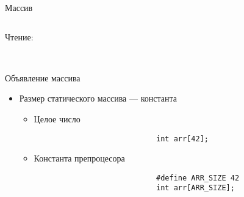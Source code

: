 \documentclass[aspectratio=169,14pt]{beamer}
\begin{document}
\begin{frame}[fragile,t]{Массив}
\begin{onlyenv}
\begin{columns}
\begin{column}{0.5\textwidth}
                    \begin{center}
                        \begin{minipage}{0.9\textwidth}
                            {\color{maincolor}Чтение:} \\
                             \\
                        \end{minipage}
                    \end{center}
                \end{column}
            \end{columns}
        \end{onlyenv}
    \end{frame}

    \begin{frame}[fragile]{Объявление массива}
        \begin{itemize}
            \item<1-> Размер статического массива --- константа
                \begin{itemize}
                    \item<2-> Целое число
                        \begin{verbatim}
                            int arr[42];
                        \end{verbatim}
                    \item<3-> Константа препроцесора
                        \begin{verbatim}
                            #define ARR_SIZE 42
                            int arr[ARR_SIZE];
                        \end{verbatim}
                \end{itemize}
        \end{itemize}
    \end{frame}
\end{document}
